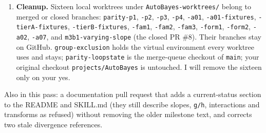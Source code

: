 \documentclass[11pt]{article}
\newcommand{\code}[1]{\texttt{#1}}
\newcommand{\file}[1]{\texttt{#1}}
\begin{document}
\begin{enumerate}
\item \textbf{Cleanup.} Sixteen local worktrees under \file{AutoBayes-worktrees/} belong to merged or closed
  branches: \file{parity-p1}, \file{-p2}, \file{-p3}, \file{-p4}, \file{-a01}, \file{-a01-fixtures},
  \file{-tierA-fixtures}, \file{-tierB-fixtures}, \file{-fam1}, \file{-fam2}, \file{-fam3}, \file{-form1},
  \file{-form2}, \file{-a02}, \file{-a07}, and \file{m3b1-varying-slope} (the closed PR \#8). Their branches stay on
  GitHub.
  \file{group-exclusion} holds the virtual environment every worktree uses and stays; \file{parity-loopstate} is the
  merge-queue checkout of \code{main}; your original checkout \file{projects/AutoBayes} is untouched. I will remove
  the sixteen only on your yes.
\end{enumerate}

\noindent Also in this pass: a documentation pull request that adds a current-status section to the README and
SKILL.md (they still describe slopes, \code{g/h}, interactions and transforms as refused) without removing the older
milestone text, and corrects two stale divergence references.
\end{document}
